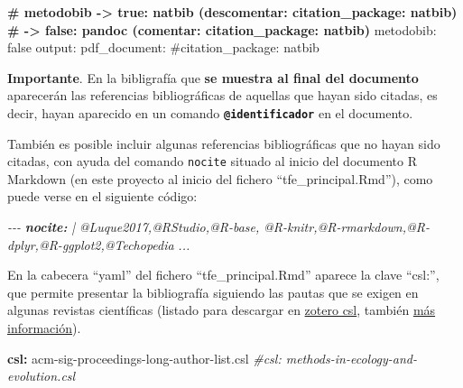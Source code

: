 \documentclass[12pt,a4paper,]{book}
\newenvironment{Shaded}{\begin{snugshade}}{\end{snugshade}}
\newcommand{\AnnotationTok}[1]{\textcolor[rgb]{0.56,0.35,0.01}{\textbf{\textit{#1}}}}
\newcommand{\AttributeTok}[1]{\textcolor[rgb]{0.13,0.29,0.53}{#1}}
\newcommand{\CommentTok}[1]{\textcolor[rgb]{0.56,0.35,0.01}{\textit{#1}}}
\newcommand{\FunctionTok}[1]{\textcolor[rgb]{0.13,0.29,0.53}{\textbf{#1}}}
\newcommand{\KeywordTok}[1]{\textcolor[rgb]{0.13,0.29,0.53}{\textbf{#1}}}
\newcommand{\NormalTok}[1]{#1}
\numberwithin{dummy}{section}
\theoremstyle{ocrenumbox}
\theoremstyle{blacknumex}
\theoremstyle{blacknumbox}
\theoremstyle{ocrenum}
\theoremstyle{ocrenum}
\begin{document}
\footnotesize

\begin{Shaded}
\begin{Highlighting}[]
\FunctionTok{\# metodobib {-}\textgreater{} true: natbib (descomentar: citation\_package: natbib) }
\FunctionTok{\#           {-}\textgreater{} false: pandoc (comentar: citation\_package: natbib)}
\NormalTok{metodobib: false}
\NormalTok{output: }
\NormalTok{  pdf\_document: }
\NormalTok{    \#citation\_package: natbib}
\end{Highlighting}
\end{Shaded}

\normalsize

\textbf{Importante}. En la bibligrafía que \textbf{se muestra al final
del documento} aparecerán las referencias bibliográficas de aquellas que
hayan sido citadas, es decir, hayan aparecido en un comando
\textbf{\texttt{@identificador}} en el documento.

También es posible incluir algunas referencias bibliográficas que no
hayan sido citadas, con ayuda del comando \texttt{nocite} situado al
inicio del documento R Markdown (en este proyecto al inicio del fichero
``tfe\_principal.Rmd''), como puede verse en el siguiente código:

\begin{Shaded}
\begin{Highlighting}[]
\CommentTok{{-}{-}{-}}
\AnnotationTok{nocite:}\CommentTok{ | }
\CommentTok{  @Luque2017,@RStudio,@R{-}base,}
\CommentTok{  @R{-}knitr,@R{-}rmarkdown,@R{-}dplyr,@R{-}ggplot2,@Techopedia}
\CommentTok{...}
\end{Highlighting}
\end{Shaded}

En la cabecera ``yaml'' del fichero ``tfe\_principal.Rmd'' aparece la
clave ``csl:'', que permite presentar la bibliografía siguiendo las
pautas que se exigen en algunas revistas científicas (listado para
descargar en \href{https://www.zotero.org/styles/}{zotero csl}, también
\href{https://citationstyles.org/publishers/}{más información}).

\begin{Shaded}
\begin{Highlighting}[]
\FunctionTok{csl}\KeywordTok{:}\AttributeTok{ acm{-}sig{-}proceedings{-}long{-}author{-}list.csl}
\CommentTok{\#csl: methods{-}in{-}ecology{-}and{-}evolution.csl}
\end{Highlighting}
\end{Shaded}
\end{document}
